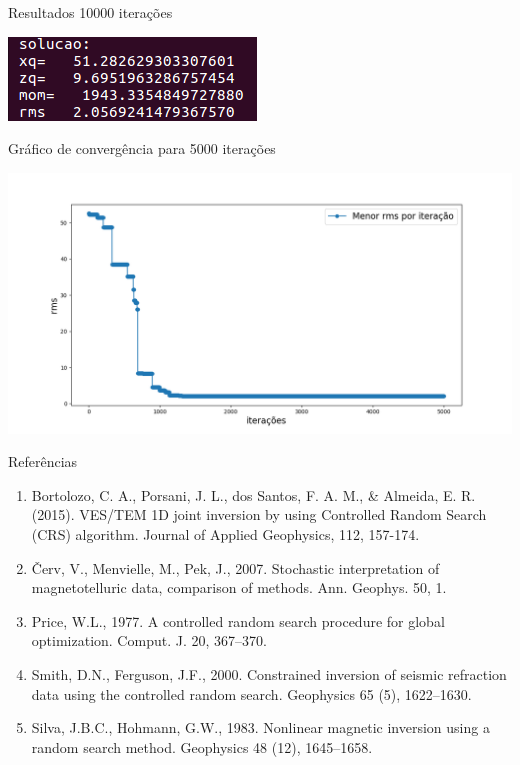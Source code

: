 \documentclass{beamer}
\begin{document}
\begin{frame}{Resultados}
10000 iterações
\begin{center}
\includegraphics[scale=1]{rms_10000}
\end{center}
\end{frame}

\begin{frame}
Gráfico de convergência para 5000 iterações
\begin{center}
\includegraphics[scale=0.35]{conv}
\end{center}
\end{frame}

\begin{frame}{Referências}
\begin{enumerate}
\item Bortolozo, C. A., Porsani, J. L., dos Santos, F. A. M., & Almeida, E. R. (2015). VES/TEM 1D joint inversion by using Controlled Random Search (CRS) algorithm. Journal of Applied Geophysics, 112, 157-174.
\item Červ, V., Menvielle, M., Pek, J., 2007. Stochastic interpretation of magnetotelluric data, comparison of methods. Ann. Geophys. 50, 1.
\item Price, W.L., 1977. A controlled random search procedure for global optimization. Comput. J. 20, 367–370.
\item Smith, D.N., Ferguson, J.F., 2000. Constrained inversion of seismic refraction data using the controlled random search. Geophysics 65 (5), 1622–1630.
\item Silva, J.B.C., Hohmann, G.W., 1983. Nonlinear magnetic inversion using a random search method. Geophysics 48 (12), 1645–1658.
\end{enumerate}
\end{frame}
\end{document}
